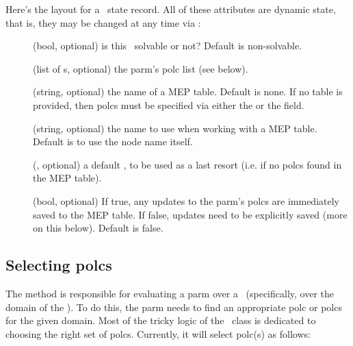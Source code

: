 \documentclass[10pt,twoside]{book}
\begin{document}
  Here's the layout for a \Parm\ state record. All of these attributes are
  dynamic state, that is, they may be changed at any time via :
  
  \begin{description}

  \item[] (bool, optional) is this \Parm\ solvable or not?
    Default is non-solvable.

  \item[] (list of \Polc{}s, optional) the parm's polc list (see below).

  \item[] (string, optional) the name of a MEP table. Default is none.
    If no table is provided, then polcs must be specified via either the
     or the  field.

  \item[] (string, optional) the name to use when working with a MEP
    table. Default is to use the node name itself.

  \item[] (\Polc, optional) a default \Polc, to be used as a last
    resort (i.e. if no polcs found in the MEP table).

  \item[] (bool, optional) If true, any updates to the parm's 
    polcs are immediately saved to the MEP table. If false, updates need to be
    explicitly saved (more on this below). Default is false.

  \end{description}
  
\subsection{Selecting polcs}

  The  method is responsible for evaluating a parm over a
  \Cells\ (specifically, over the domain of the \Cells). To do this, the parm
  needs to find an appropriate polc or polcs for the given domain. Most of the
  tricky logic of the \Parm\ class is dedicated to choosing the right set of
  polcs.  Currently, it will select polc(s) as follows:
\end{document}
